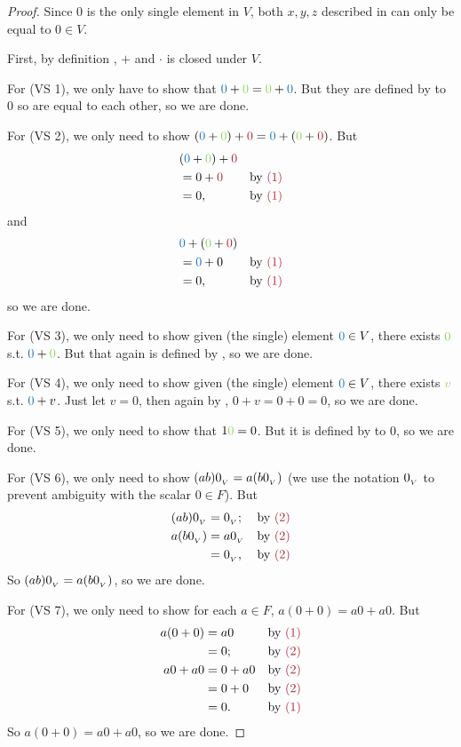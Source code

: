 \begin{proof}
Since \(0\) is the only single element in \(V\), both \(x, y, z\) described in  can only be equal to \(0 \in V\).

First, by definition , \(+\) and \(\cdot\) is closed under \(V\).

For (VS 1), we only have to show that \(\BLUE{0} + \GREEN{0} = \GREEN{0} + \BLUE{0}\).
But they are defined by  to \(0\) so are equal to each other, so we are done.

For (VS 2), we only need to show \((\BLUE{0} + \GREEN{0}) + \MAROON{0} = \BLUE{0} + (\GREEN{0} + \MAROON{0})\).
But
\begin{align*}
    & (\BLUE{0} + \GREEN{0}) + \MAROON{0} \\
    & = 0 + \MAROON{0} & \text{by \MAROON{(1)}} \\
    & = 0, & \text{by \MAROON{(1)}}
\end{align*}
and
\begin{align*}
    & \BLUE{0} + (\GREEN{0} + \MAROON{0}) \\
    & = \BLUE{0} + 0 & \text{by \MAROON{(1)}} \\
    & = 0, & \text{by \MAROON{(1)}}
\end{align*}
so we are done.

For (VS 3), we only need to show given (the single) element \(\BLUE{0} \in V\), there exists \(\GREEN{0}\) s.t. \(\BLUE{0} + \GREEN{0}\).
But that again is defined by , so we are done.

For (VS 4), we only need to show given (the single) element \(\BLUE{0} \in V\), there exists \(\GREEN{v}\) s.t. \(\BLUE{0} + v\).
Just let \(v = 0\), then again by , \(0 + v = 0 + 0 = 0\), so we are done.

For (VS 5), we only need to show that \(1 \GREEN{0} = 0\).
But it is defined by  to \(0\), so we are done.

For (VS 6), we only need to show \((ab)0_{_V} = a(b0_{_V})\) (we use the notation \(0_{_V}\) to prevent ambiguity with the scalar \(0 \in F\)).
But
\begin{align*}
    (ab)\OV & = \OV; & \text{by \MAROON{(2)}} \\
    a(b\OV) & = a\OV & \text{by \MAROON{(2)}} \\
            & = \OV, & \text{by \MAROON{(2)}}
\end{align*}
So \((ab)0_{_V} = a(b0_{_V})\), so we are done.

For (VS 7), we only need to show for each \(a \in F\), \(a(0 + 0) = a0 + a0\).
But
\begin{align*}
    a(0 + 0) & = a0 & \text{by \MAROON{(1)}} \\
             & = 0; & \text{by \MAROON{(2)}} \\
     a0 + a0 & = 0 + a0 & \text{by \MAROON{(2)}} \\
             & = 0 + 0 & \text{by \MAROON{(2)}} \\
             & = 0. & \text{by \MAROON{(1)}}
\end{align*}
So \(a(0 + 0) = a0 + a0\), so we are done.


\end{proof}

